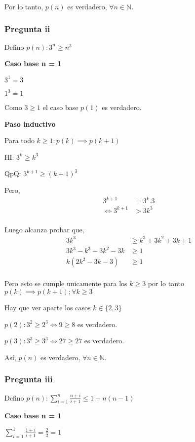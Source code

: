 Por lo tanto, $p(n)$ es verdadero, $\forall n \in \mathbb{N}$.

\subsubsection{Pregunta ii}

Defino $ p(n): 3^n \geq n^3$

\textbf{Caso base n = 1}

$ 3^1 = 3 $

$ 1^3 = 1 $

Como $ 3 \geq 1 $ el caso base $p(1)$ es verdadero.

\textbf{Paso inductivo}

Para todo $k \geq 1: p(k) \implies p(k+1)$

HI: $ 3^k \geq k^3$

QpQ: $ 3^{k+1} \geq (k+1)^3$

Pero,
\begin{align*}
    3^{k+1} &= 3^k . 3 \\
    \iff 3^{k+1} &> 3k^3 \\
\end{align*}

Luego alcanza probar que,
\begin{align*}
    3k^3 &\geq k^3 + 3k^2 + 3k + 1 \\
    3k^3 - k^3 - 3k^2 - 3k &\geq 1 \\
    k(2k^2 - 3k -3) &\geq 1 \\
\end{align*}

Pero esto se cumple unicamente para los $k \geq 3$ por lo tanto $p(k) \implies p(k+1); \forall k \geq 3$

Hay que ver aparte los casos $k \in \{ 2,3 \}$

$p(2): 3^2 \geq 2^3 \iff 9 \geq 8$ es verdadero.

$p(3): 3^3 \geq 3^3 \iff 27 \geq 27$ es verdadero.

Así, $p(n)$ es verdadero, $\forall n \in \mathbb{N}$.

\subsubsection{Pregunta iii}

Defino $ p(n): \sum_{i=1}^{n}\frac{n+i}{i+1} \leq 1+n(n-1)$

\textbf{Caso base n = 1}

$ \sum_{i=1}^{1}\frac{1+i}{i+1} = \frac{2}{2} = 1 $

